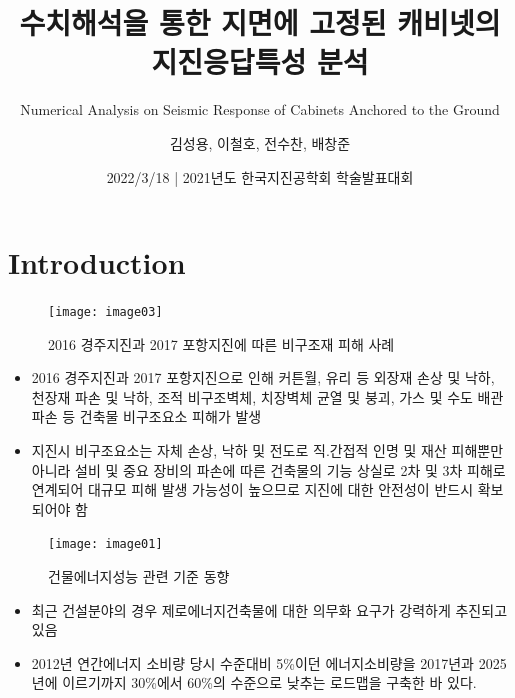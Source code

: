 \documentclass[9pt]{beamer}
\title{\textbf{수치해석을 통한 지면에 고정된 캐비넷의 지진응답특성 분석}}
\subtitle{Numerical Analysis on Seismic Response of Cabinets Anchored to the Ground}
\author{김성용\inst{1}, 이철호\inst{2}, 전수찬\inst{3}, 배창준\inst{4}}
\institute[CWNU] %
{
	\inst{1}%
	조교수, 창원대학교 건축공학과 | sungyong.kim@changwon.ac.kr\and
	\inst{2}%
	교수, 서울대학교 건축학과 \and
	\inst{2}%
	박사과정, 서울대학교 건축학과 \and
	\inst{2}%
	박사과정, 서울대학교 건축학과}
\date{2022/3/18 | 2021년도 한국지진공학회 학술발표대회}
\begin{document}
\begin{frame}
	\titlepage
\end{frame}

\section{Introduction}
	\begin{frame}
	\begin{figure}
	\centering
	\texttt{[image: image03]}
	\caption{2016 경주지진과 2017 포항지진에 따른 비구조재 피해 사례}
	\label{fig:003}
\end{figure}

\begin{itemize}
	\item 2016 경주지진과 2017 포항지진으로 인해 커튼월, 유리 등 외장재 손상 및 낙하, 천장재 파손 및 낙하, 조적 비구조벽체, 치장벽체 균열 및 붕괴, 가스 및 수도 배관 파손 등 건축물 비구조요소 피해가 발생
	\item 지진시 비구조요소는 자체 손상, 낙하 및 전도로 직.간접적 인명 및 재산 피해뿐만 아니라 설비 및 중요 장비의 파손에 따른 건축물의 기능 상실로 2차 및 3차 피해로 연계되어 대규모 피해 발생 가능성이 높으므로 지진에 대한 안전성이 반드시 확보되어야 함
\end{itemize}
	\end{frame}
	\begin{frame}
	\begin{figure}[b!]
	\centering
	\texttt{[image: image01]}
	\caption{건물에너지성능 관련 기준 동향}
	\label{fig:001}
\end{figure}
\begin{itemize}
	\item 최근 건설분야의 경우 제로에너지건축물에 대한 의무화 요구가 강력하게 추진되고 있음
	\item 2012년 연간에너지 소비량 당시 수준대비 5\%이던 에너지소비량을 2017년과 2025년에 이르기까지 30\%에서 60\%의 수준으로 낮추는 로드맵을 구축한 바 있다.
\end{itemize}
	\end{frame}
\end{document}
